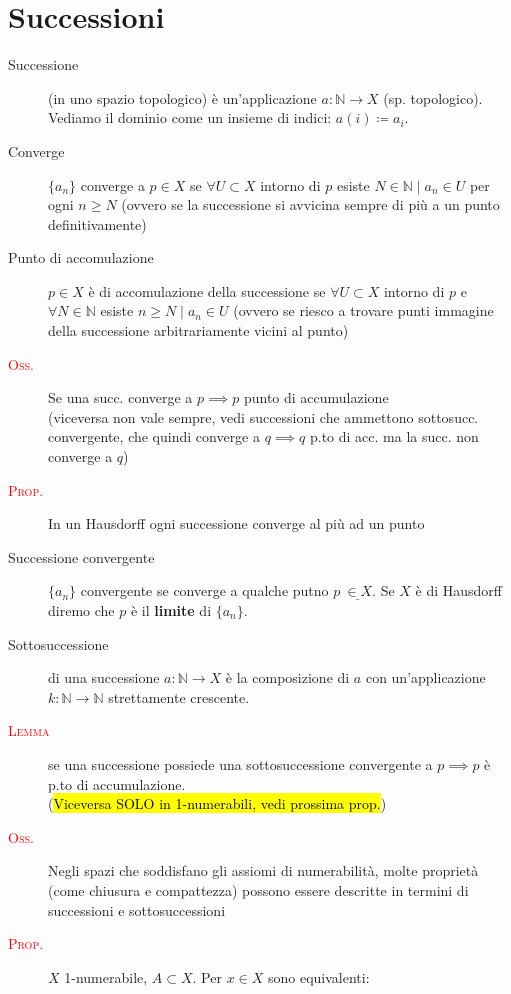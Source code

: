 \documentclass[a4paper,10pt]{article}
\newcommand{\myth}{\normalfont \scshape \textcolor{red}}
\theoremstyle{remark}
\theoremstyle{definition}
\begin{document}
\section*{Successioni}
\begin{description}
    \item[Successione] (in uno spazio topologico) è un'applicazione $a: \mathbb{N} \to X$ (sp. topologico). Vediamo il dominio come un insieme di indici: $a(i) \coloneqq a_i$.
    \item[Converge] $\{ a_n \}$ converge a $p \in X$ se $\forall  U \subset X$ intorno di $p$ esiste $ N \in \mathbb{N} \mid a_n \in U$ per ogni $n \ge N$ (ovvero se la successione si avvicina sempre di più a un punto definitivamente)
    \item[Punto di accomulazione] $p \in X$ è di accomulazione della successione se $\forall  U \subset X$ intorno di $p$ e $ \forall N \in \mathbb{N}$ esiste $n \ge N \mid a_n \in U$ (ovvero se riesco a trovare punti immagine della successione arbitrariamente vicini al punto)
    
    \item[\myth{Oss.}] Se una succ. converge a $p \implies p$ punto di accumulazione \\
    (viceversa non vale sempre, vedi successioni che ammettono sottosucc. convergente, che quindi converge a $q \implies q$ p.to di acc. ma la succ. non converge a $q$)

    \item[\myth{Prop.}] In un Hausdorff ogni successione converge al più ad un punto
    
    \item[Successione convergente] $\{ a_n \}$ convergente se converge a qualche putno $p \: \underline{\in X}$. Se $X$ è di Hausdorff diremo che $p$ è il \textbf{limite} di $\{ a_n \}$.
    
    \item[Sottosuccessione] di una successione  $a: \mathbb{N} \to X$ è la composizione di $a$ con un'applicazione $k: \mathbb{N} \to \mathbb{N}$ strettamente crescente.

    \item[\myth{Lemma}] se una successione possiede una sottosuccessione convergente a $p \implies p$ è p.to di accumulazione. \\(\hl{Viceversa SOLO in 1-numerabili, vedi prossima prop.}) 

    \item[\myth{Oss.}] Negli spazi che soddisfano gli assiomi di numerabilità, molte proprietà (come chiusura e compattezza) possono essere descritte in termini di successioni e sottosuccessioni
    \item[\myth{Prop.}] $X$ 1-numerabile, $A\subset X$. Per $x \in X$ sono equivalenti:
    

\end{description}
\end{document}
